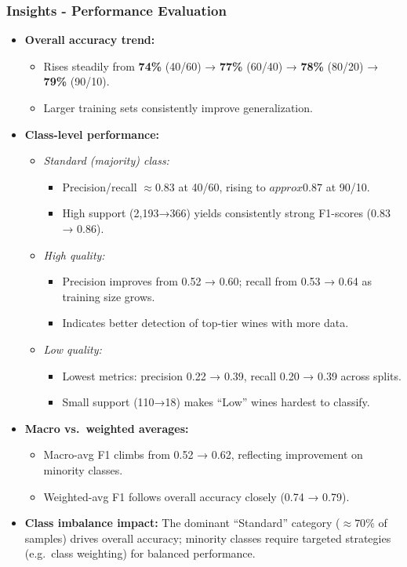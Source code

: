 \subsubsection*{Insights - Performance Evaluation}
\begin{itemize}
	\item \textbf{Overall accuracy trend:}
	      \begin{itemize}
		      \item Rises steadily from \textbf{74\%} (40/60) → \textbf{77\%} (60/40) → \textbf{78\%} (80/20) → \textbf{79\%} (90/10).
		      \item Larger training sets consistently improve generalization.
	      \end{itemize}
	\item \textbf{Class-level performance:}
	      \begin{itemize}
		      \item \emph{Standard (majority) class:}
		            \begin{itemize}
			            \item Precision/recall \(\approx0.83\) at 40/60, rising to \(approx0.87\) at 90/10.
			            \item High support (2,193→366) yields consistently strong F1-scores (0.83 → 0.86).
		            \end{itemize}
		      \item \emph{High quality:}
		            \begin{itemize}
			            \item Precision improves from 0.52 → 0.60; recall from 0.53 → 0.64 as training size grows.
			            \item Indicates better detection of top‐tier wines with more data.
		            \end{itemize}
		      \item \emph{Low quality:}
		            \begin{itemize}
			            \item Lowest metrics: precision 0.22 → 0.39, recall 0.20 → 0.39 across splits.
			            \item Small support (110→18) makes “Low” wines hardest to classify.
		            \end{itemize}
	      \end{itemize}
	\item \textbf{Macro vs.\ weighted averages:}
	      \begin{itemize}
		      \item Macro-avg F1 climbs from 0.52 → 0.62, reflecting improvement on minority classes.
		      \item Weighted-avg F1 follows overall accuracy closely (0.74 → 0.79).
	      \end{itemize}
	\item \textbf{Class imbalance impact:}
	      The dominant “Standard” category (\(\approx70\%\) of samples) drives overall accuracy; minority classes require targeted strategies (e.g.\ class weighting) for balanced performance.
\end{itemize}

